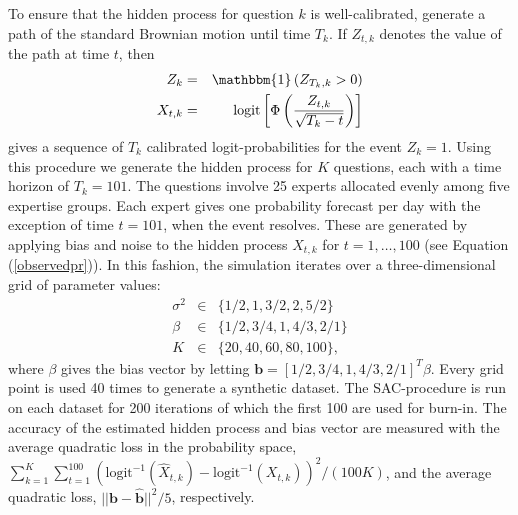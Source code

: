\documentclass[aoas, preprint]{imsart}
\numberwithin{equation}{section}
\theoremstyle{plain}
\newcommand{\logit}{\text{logit}}
\begin{document}
To ensure that the hidden process for question $k$ is well-calibrated, generate a path of the standard Brownian motion until time $T_k$. If $Z_{t,k}$ denotes the value of the path at time $t$, then
\begin{eqnarray*}
Z_k &=& \mathbbm{1}\left( Z_{T_k, k}  > 0\right)\\
 X_{t,k} &=& \logit \left[ \Phi \left(\frac{Z_{t, k}}{\sqrt{T_k- t}} \right) \right]
\end{eqnarray*}
gives a sequence of $T_k$ calibrated logit-probabilities for the event $Z_k = 1$. Using this procedure we generate the hidden process for $K$ questions, each with a time horizon of $T_k = 101$. The questions involve 25 experts allocated evenly among five expertise groups. Each expert gives one probability forecast per day with the exception of time $t = 101$, when the event resolves. These are generated by applying bias and noise to the hidden process $X_{t,k}$ for $t = 1, \dots, 100$ (see Equation (\ref{observedpr})). In this fashion, the simulation iterates over a three-dimensional grid of parameter values:
\begin{eqnarray*}
\sigma^2 &\in& \{1/2, 1, 3/2, 2, 5/2\}\\
\beta &\in& \{1/2, 3/4, 1, 4/3, 2/1\}\\
K &\in& \{20, 40, 60, 80, 100\},
\end{eqnarray*}
where $\beta$ gives the bias vector by letting $\boldsymbol{b} = [1/2, 3/4, 1, 4/3, 2/1]^T \beta$. Every grid point is used  40 times to generate a synthetic dataset. The SAC-procedure is run on each dataset for 200 iterations of which the first 100 are used for burn-in. The accuracy of the estimated hidden process and bias vector are measured with the average quadratic loss in the probability space, $\sum_{k=1}^K \sum_{t=1}^{100} ( \logit^{-1}(\hat{X}_{t,k}) - \logit^{-1}(X_{t,k}))^2 / (100K)$, and the average quadratic loss, $|| \boldsymbol{b} - \hat{\boldsymbol{b}}||^2/5$, respectively.

\end{document}
